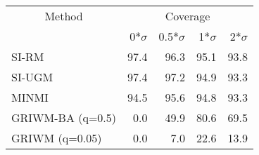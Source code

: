 
\begin{tabular}{lrrrr}
\toprule
\multicolumn{1}{c}{Method} & \multicolumn{4}{c}{Coverage} \\
 & 0*$\sigma$ & 0.5*$\sigma$ & 1*$\sigma$ & 2*$\sigma$\\
\midrule
SI-RM & 97.4 & 96.3 & 95.1 & 93.8\\
SI-UGM & 97.4 & 97.2 & 94.9 & 93.3\\
MINMI & 94.5 & 95.6 & 94.8 & 93.3\\
GRIWM-BA (q=0.5) & 0.0 & 49.9 & 80.6 & 69.5\\
GRIWM (q=0.05) & 0.0 & 7.0 & 22.6 & 13.9\\
\bottomrule
\end{tabular}
